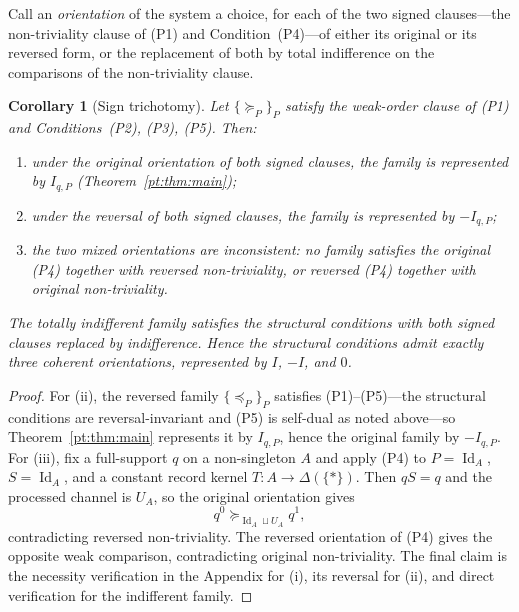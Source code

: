 \documentclass[11pt,a4paper]{article}
\newtheorem{corollary}[theorem]{Corollary}
\theoremstyle{definition}
\newcommand{\Id}{\operatorname{Id}}
\newcommand{\1}{\mathbf 1}
\begin{document}
Call an \emph{orientation} of the system a choice, for each of the two signed clauses---the non-triviality clause of
\textup{(P1)} and Condition~\textup{(P4)}---of either its original or its reversed form, or the replacement of both by
total indifference on the comparisons of the non-triviality clause.

\begin{corollary}[Sign trichotomy]\label{pt:cor:signduality}
Let $\{\succeq_P\}_P$ satisfy the weak-order clause of \textup{(P1)} and Conditions~\textup{(P2)}, \textup{(P3)},
\textup{(P5)}.  Then:
\begin{enumerate}[label=\textup{(\roman*)},leftmargin=*]
\item under the original orientation of both signed clauses, the family is represented by $I_{q,P}$
\textup{(}Theorem~\ref{pt:thm:main}\textup{)};
\item under the reversal of both signed clauses, the family is represented by $-I_{q,P}$;
\item the two mixed orientations are inconsistent: no family satisfies the original \textup{(P4)} together with
reversed non-triviality, or reversed \textup{(P4)} together with original non-triviality.
\end{enumerate}
The totally indifferent family satisfies the structural conditions with both signed clauses replaced by indifference.
Hence the structural conditions admit exactly three coherent orientations, represented by $I$, $-I$, and $0$.
\end{corollary}

\begin{proof}
For (ii), the reversed family $\{\preceq_P\}_P$ satisfies \textup{(P1)}--\textup{(P5)}---the structural conditions are
reversal-invariant and \textup{(P5)} is self-dual as noted above---so Theorem~\ref{pt:thm:main} represents it by
$I_{q,P}$, hence the original family by $-I_{q,P}$.  For (iii), fix a full-support $q$ on a non-singleton $A$ and
apply \textup{(P4)} to $P=\Id_A$, $S=\Id_A$, and a constant record kernel
$T:A\to\Delta(\{\ast\})$.  Then $qS=q$ and the processed channel is $U_A$, so the original orientation gives
\[
q^0\succeq_{\Id_A\sqcup U_A}q^1,
\]
contradicting reversed non-triviality.  The reversed orientation of \textup{(P4)} gives the opposite weak comparison,
contradicting original non-triviality.  The final claim is the necessity verification in the Appendix for (i), its reversal for (ii),
and direct verification for the indifferent family.
\end{proof}
\end{document}
